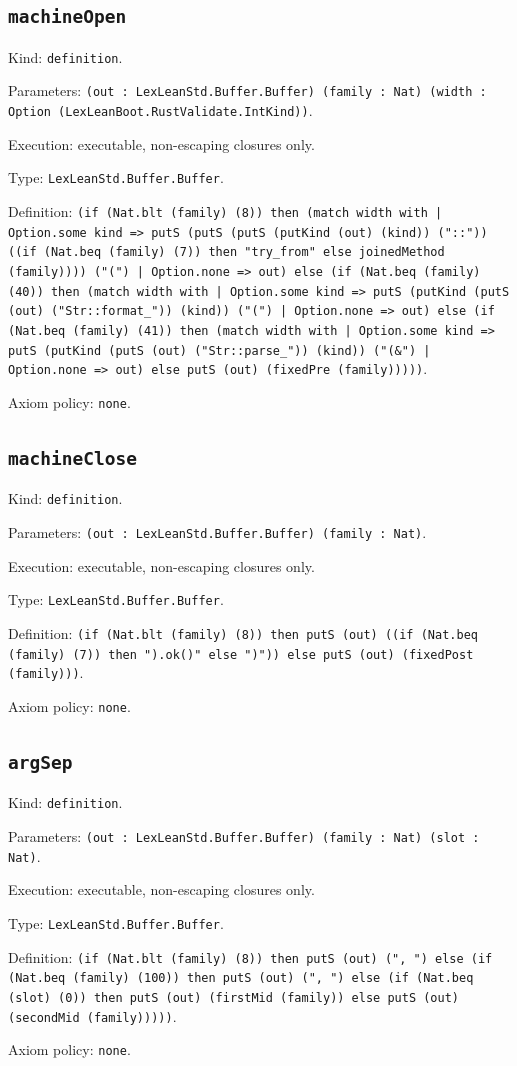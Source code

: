 \documentclass[11pt]{article}
\begin{document}
\subsection*{\texttt{machineOpen}}
\noindent Kind: \texttt{definition}.\par
\noindent Parameters: \texttt{(out : LexLeanStd.Buffer.Buffer) (family : Nat) (width : Option (LexLeanBoot.RustValidate.IntKind))}.\par
\noindent Execution: executable, non-escaping closures only.\par
\noindent Type: \texttt{LexLeanStd.Buffer.Buffer}.\par
\noindent Definition: \texttt{(if (Nat.blt (family) (8)) then (match width with | Option.some kind => putS (putS (putS (putKind (out) (kind)) ("::")) ((if (Nat.beq (family) (7)) then "try\_from" else joinedMethod (family)))) ("(") | Option.none => out) else (if (Nat.beq (family) (40)) then (match width with | Option.some kind => putS (putKind (putS (out) ("Str::format\_")) (kind)) ("(") | Option.none => out) else (if (Nat.beq (family) (41)) then (match width with | Option.some kind => putS (putKind (putS (out) ("Str::parse\_")) (kind)) ("(\&") | Option.none => out) else putS (out) (fixedPre (family)))))}.\par
\noindent Axiom policy: \texttt{none}.\par
\subsection*{\texttt{machineClose}}
\noindent Kind: \texttt{definition}.\par
\noindent Parameters: \texttt{(out : LexLeanStd.Buffer.Buffer) (family : Nat)}.\par
\noindent Execution: executable, non-escaping closures only.\par
\noindent Type: \texttt{LexLeanStd.Buffer.Buffer}.\par
\noindent Definition: \texttt{(if (Nat.blt (family) (8)) then putS (out) ((if (Nat.beq (family) (7)) then ").ok()" else ")")) else putS (out) (fixedPost (family)))}.\par
\noindent Axiom policy: \texttt{none}.\par
\subsection*{\texttt{argSep}}
\noindent Kind: \texttt{definition}.\par
\noindent Parameters: \texttt{(out : LexLeanStd.Buffer.Buffer) (family : Nat) (slot : Nat)}.\par
\noindent Execution: executable, non-escaping closures only.\par
\noindent Type: \texttt{LexLeanStd.Buffer.Buffer}.\par
\noindent Definition: \texttt{(if (Nat.blt (family) (8)) then putS (out) (", ") else (if (Nat.beq (family) (100)) then putS (out) (", ") else (if (Nat.beq (slot) (0)) then putS (out) (firstMid (family)) else putS (out) (secondMid (family)))))}.\par
\noindent Axiom policy: \texttt{none}.\par
\end{document}
